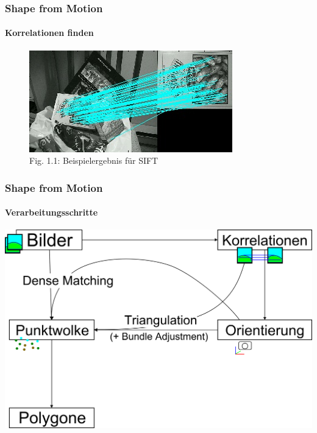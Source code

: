 \documentclass{beamer}
\begin{document}
\begin{frame}
	\frametitle{Shape from Motion}
	\framesubtitle{Korrelationen finden}

	\begin{figure}
		\includegraphics[width=\linewidth]{includes/sift}\\
		{\scriptsize Fig. 1.1: Beispielergebnis für SIFT}
	\end{figure}
\end{frame}


\begin{frame}
	\frametitle{Shape from Motion}
	\framesubtitle{Verarbeitungsschritte}

	\includegraphics[width=\linewidth]{includes/shape-from-motion_process}
\end{frame}
\end{document}
